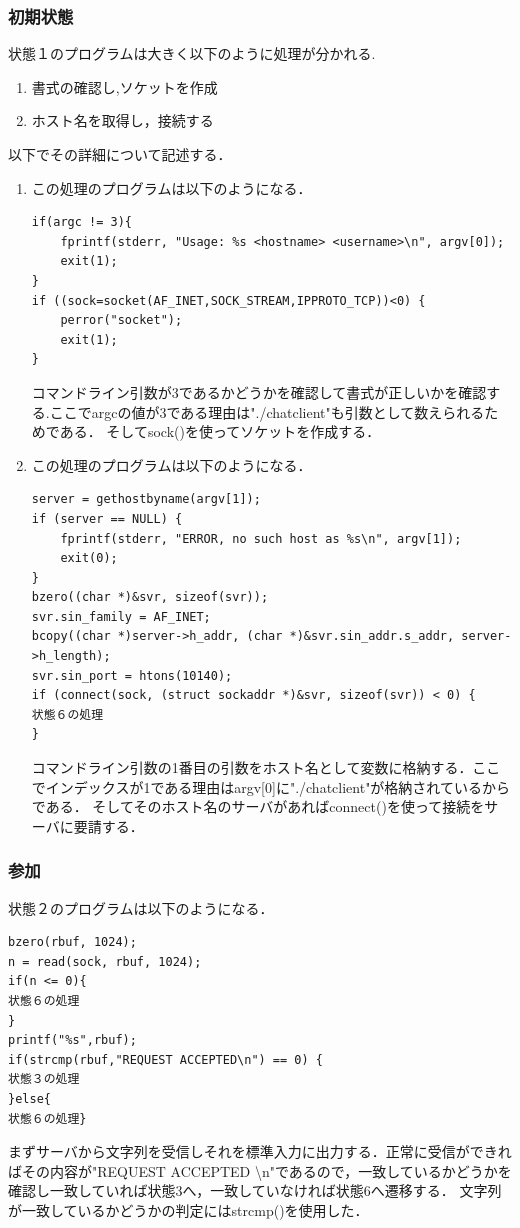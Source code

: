 \documentclass[dvipdfmx]{jarticle}
\begin{document}
\subsubsection{初期状態}
状態１のプログラムは大きく以下のように処理が分かれる.
\begin{enumerate}
    \item 書式の確認し,ソケットを作成
    \item ホスト名を取得し，接続する
\end{enumerate}
以下でその詳細について記述する．
\begin{enumerate}
    \item この処理のプログラムは以下のようになる．
\begin{lstlisting}
if(argc != 3){
    fprintf(stderr, "Usage: %s <hostname> <username>\n", argv[0]);
    exit(1);
}
if ((sock=socket(AF_INET,SOCK_STREAM,IPPROTO_TCP))<0) {
    perror("socket");
    exit(1);
}
\end{lstlisting}
コマンドライン引数が3であるかどうかを確認して書式が正しいかを確認する.ここでargcの値が3である理由は"./chatclient"も引数として数えられるためである．
そしてsock()を使ってソケットを作成する．
    \item この処理のプログラムは以下のようになる．
\begin{lstlisting}
server = gethostbyname(argv[1]);
if (server == NULL) {
    fprintf(stderr, "ERROR, no such host as %s\n", argv[1]);
    exit(0);
}
bzero((char *)&svr, sizeof(svr));
svr.sin_family = AF_INET;
bcopy((char *)server->h_addr, (char *)&svr.sin_addr.s_addr, server->h_length);
svr.sin_port = htons(10140);
if (connect(sock, (struct sockaddr *)&svr, sizeof(svr)) < 0) {
状態６の処理
}
\end{lstlisting}
コマンドライン引数の1番目の引数をホスト名として変数に格納する．ここでインデックスが1である理由はargv[0]に"./chatclient"が格納されているからである．
そしてそのホスト名のサーバがあればconnect()を使って接続をサーバに要請する．
\end{enumerate}
\subsubsection{参加}
状態２のプログラムは以下のようになる．
\begin{lstlisting}
bzero(rbuf, 1024);
n = read(sock, rbuf, 1024);
if(n <= 0){
状態６の処理
}
printf("%s",rbuf);
if(strcmp(rbuf,"REQUEST ACCEPTED\n") == 0) {
状態３の処理
}else{
状態６の処理}
\end{lstlisting}
まずサーバから文字列を受信しそれを標準入力に出力する．正常に受信ができればその内容が"REQUEST ACCEPTED \textbackslash n"であるので，一致しているかどうかを確認し一致していれば状態3へ，一致していなければ状態6へ遷移する．
文字列が一致しているかどうかの判定にはstrcmp()を使用した．
\end{document}
